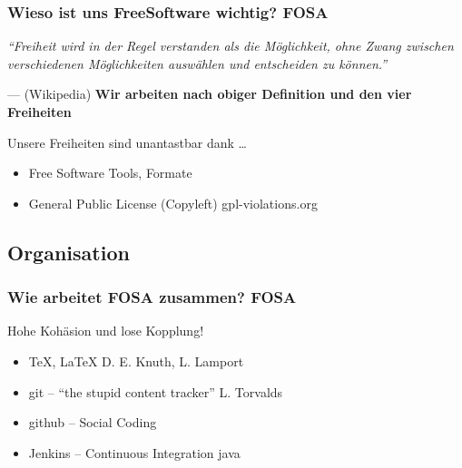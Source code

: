 \begin{frame}
	\frametitle{Wieso ist uns FreeSoftware wichtig? 
		\hfill{} 
		\footnotesize{FOSA}}
	\textit{"`Freiheit wird in der Regel verstanden als die 
	Möglichkeit, ohne Zwang zwischen verschiedenen Möglichkeiten 
	auswählen und entscheiden zu können."'} 
	
	\hfill{} --- (Wikipedia)
	\vfill{}
	\textbf{Wir arbeiten nach obiger Definition und den vier Freiheiten}
	\vfill{}
	\begin{exampleblock}{Unsere Freiheiten sind unantastbar dank \dots}
		\begin{itemize}
			\item Free Software 
				\hfill{} 
				\footnotesize{Tools, Formate}
				\normalsize
			\item General Public License (Copyleft) 
				\hfill{}
				\footnotesize{gpl-violations.org}
				\normalsize
		\end{itemize}
	\end{exampleblock}
\end{frame}

\subsection{Organisation}
\begin{frame}
	\frametitle{Wie arbeitet FOSA zusammen? 
		\hfill{} \footnotesize{FOSA}}
	\begin{block}{Hohe Kohäsion und lose Kopplung!}
		\begin{itemize}
			\item \TeX, \LaTeX 
				\hfill{} 
				\footnotesize{D. E. Knuth, L. Lamport} 
				\normalsize
			\item git -- "`the stupid content tracker"'
				\hfill{}
				\footnotesize{L. Torvalds}
				\normalsize
			\item github -- Social Coding
			\item Jenkins -- Continuous Integration
				\hfill{}
				\footnotesize{java}
				\normalsize
		\end{itemize}
	\end{block}
\end{frame}


